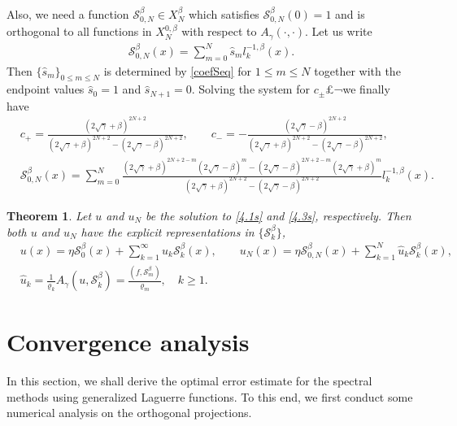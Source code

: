 \documentclass[10pt,reqno]{amsart}
\newtheorem{thm}{\bf Theorem}
\theoremstyle{remark}
\theoremstyle{definition}
\begin{document}
Also, we  need a function $\mathcal{S}^{\beta}_{0,N} \in X^{\beta}_N$  which satisfies $\mathcal{S}^{\beta}_{0,N}(0)=1$ and  is  orthogonal to all functions in  $X^{0,\beta}_N$ with respect to $A_{\gamma}(\cdot,\cdot)$. Let us write
\begin{align*}
\mathcal{S}_{0,N}^{\beta}(x) = \sum_{m=0}^{N}\hat s_m l_k^{-1,\beta}(x).
\end{align*}
Then $\{\hat s_m\}_{0\le m\le N}$ is determined by \eqref{coefSeq}  for $1\le m\le N$ together with the endpoint values $\hat s_0=1$ and  $\hat s_{N+1}=0$. Solving the system for  $c_{\pm }$£¬we finally have
\begin{align*}
&c_{+} =  \frac{(2\sqrt{\gamma}+\beta )^{2N+2} }{ (2\sqrt{\gamma}+\beta )^{2N+2} - (2\sqrt{\gamma}-\beta )^{2N+2} }  ,
\qquad
c_{-} =  -\frac{(2\sqrt{\gamma}-\beta )^{2N+2} }{ (2\sqrt{\gamma}+\beta )^{2N+2} - (2\sqrt{\gamma}-\beta )^{2N+2} }  ,
\\
&\mathcal{S}_{0,N}^{\beta}(x) = \sum_{m=0}^{N} \frac{(2\sqrt{\gamma}+\beta )^{2N+2-m} (2\sqrt{\gamma}-\beta )^{m}
- (2\sqrt{\gamma}-\beta )^{2N+2-m} (2\sqrt{\gamma}+\beta )^{m}   }{ (2\sqrt{\gamma}+\beta )^{2N+2} - (2\sqrt{\gamma}-\beta )^{2N+2} }  l_k^{-1,\beta}(x).
\end{align*}

\begin{thm} Let $u$ and $u_N$ be the solution  to  \eqref{4.1s}  and  \eqref{4.3s}, respectively. Then
both $u$ and $u_N$ have the explicit representations in $\{\mathcal{S}^{\beta}_k\}$,
\begin{align*}
    & u(x) = \eta \mathcal{S}_0^{\beta}(x) + \sum_{k=1}^{\infty} \hat u_k \mathcal{S}_k^{\beta}(x),  \qquad
    u_N(x) =\eta \mathcal{S}_{0,N}^{\beta}(x) +  \sum_{k=1}^{N} \hat u_k \mathcal{S}_k^{\beta}(x),
    \\
    &\hat u_k
    = \frac{1}{\varrho_k} A_{\gamma}(u, \mathcal{S}_k^{\beta})
    = \frac{(f, \mathcal{S}^{\beta}_m)}{\varrho_m}, \quad k\ge 1.
\end{align*}
\end{thm}

\section{Convergence analysis}\setcounter{equation}{0} \setcounter{lmm}{0} \setcounter{thm}{0}
In this section, we shall derive  the optimal  error estimate for the spectral methods using generalized Laguerre functions.
To this end, we first conduct some numerical analysis on the orthogonal projections.
\end{document}
